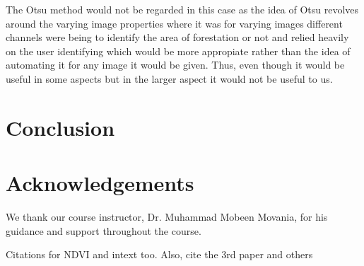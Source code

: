 \documentclass[12pt,a4paper,IEEEtran]{article}
\begin{document}
The Otsu method would not be regarded in this case as the idea of Otsu revolves around the varying image properties where it was for varying images different channels were being to identify the area of forestation or not and relied heavily on the user identifying which would be more appropiate rather than the idea of automating it for any image it would be given. Thus, even though it would be useful in some aspects but in the larger aspect it would not be useful to us.  
 


\section{Conclusion}

\section{Acknowledgements}
We thank our course instructor, Dr. Muhammad Mobeen Movania, for his guidance and support throughout the course. 




Citations for NDVI and intext too. Also, cite the 3rd paper and others
\end{document}
